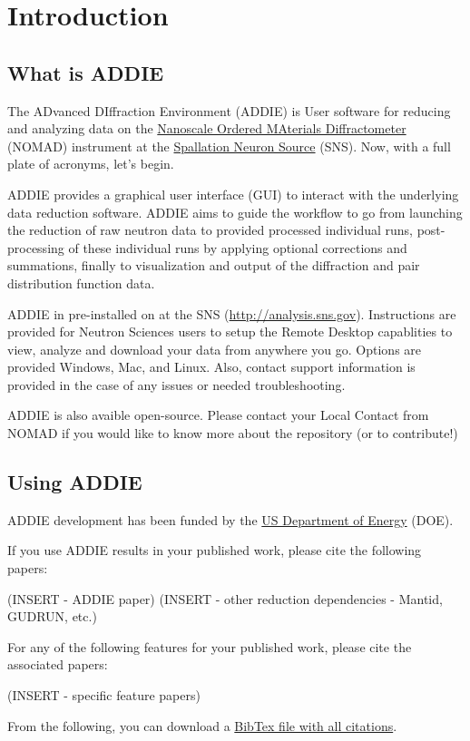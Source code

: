 \chapter{Introduction}
\section{What is ADDIE} 
The ADvanced DIffraction Environment (ADDIE) is User software for 
reducing and analyzing data on the  
\href{http://https://neutrons.ornl.gov/nomad}{Nanoscale Ordered MAterials Diffractometer}  (NOMAD)  instrument at the \href{https://neutrons.ornl.gov/sns}{Spallation Neuron Source} (SNS). 
Now, with a full plate of acronyms, let's begin.


ADDIE provides a graphical user interface (GUI) to interact with the 
underlying data reduction software. ADDIE aims to guide the workflow to 
go from launching the reduction of raw neutron data to provided processed 
individual runs, post-processing of these individual runs  by applying 
optional corrections and summations, finally to visualization and 
output of the diffraction and pair distribution function data. 

ADDIE in pre-installed on \analysis at the SNS 
(\url{http://analysis.sns.gov}). Instructions are provided for Neutron Sciences users 
to setup the Remote Desktop capablities to view, analyze and download your data 
from anywhere you go. Options are provided Windows, Mac, and Linux. 
Also, contact support information is provided in the case of 
any issues or needed troubleshooting.

ADDIE is also avaible open-source. 
Please contact your Local Contact from NOMAD if you would like to 
know more about the repository (or to contribute!)
\section{Using ADDIE}

ADDIE development has been funded by the 
\href{https://www.energy.gov/}{US Department of Energy} (DOE). 

If you use ADDIE results in your published work, please cite the following papers:

(INSERT - ADDIE paper)
(INSERT - other reduction dependencies - Mantid, GUDRUN, etc.)

For any of the following features for your published work, please cite the associated papers:

(INSERT - specific feature papers)

From the following, you can download a \href{http://https://neutrons.ornl.gov/nomad}{BibTex file with all citations}.


